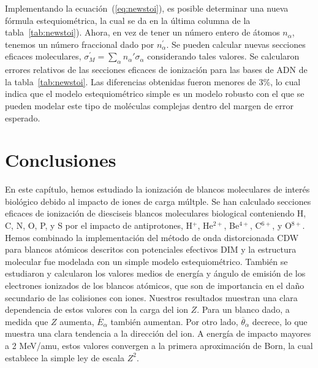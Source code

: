 Implementando la ecuación~(\ref{eq:newstoi}), es posible determinar
una nueva fórmula estequiométrica, la cual se da en la última columna de
la tabla~\ref{tab:newstoi}). Ahora, en vez de tener un número entero 
de átomos $n_{\alpha}$, tenemos un número fraccional dado por 
$n_{\alpha}^{\prime}$. Se pueden calcular nuevas secciones eficaces 
moleculares, $\sigma^{\prime}_{M}=\sum_{\alpha}n_{\alpha}'\sigma_{\alpha}$
considerando tales valores. Se calcularon errores relativos de las 
secciones eficaces de ionización para las bases de ADN de la 
tabla~\ref{tab:newstoi}. Las diferencias obtenidas fueron menores de
3\%, lo cual indica que el modelo estequiométrico simple 
es un modelo robusto con el que se pueden modelar este tipo de 
moléculas complejas dentro del margen de error esperado.

\section{Conclusiones}

En este capítulo, hemos estudiado la ionización de blancos moleculares 
de interés biológico debido al impacto de iones de carga múltple. Se han
calculado secciones eficaces de ionización de diesciseis blancos 
moleculares biological conteniendo H, C, N, O, P, y S por el impacto de
antiprotones, H$^{+}$, He$^{2+}$, Be$^{4+}$, C$^{6+}$, y O$^{8+}$. 
Hemos combinado la implementación del método de onda distorcionada
CDW para blancos atómicos descritos con potenciales efectivos DIM y la 
estructura molecular fue modelada con un simple modelo estequiométrico.
También se estudiaron y calcularon los valores medios de energía y 
ángulo de emisión de los electrones ionizados de los blancos atómicos, 
que son de importancia en el daño secundario de las colisiones con iones.
Nuestros resultados muestran una clara dependencia de estos valores con 
la carga del ion $Z$. Para un blanco dado, a medida que $Z$ aumenta,
$\overline{E}_{\alpha}$ también aumentan. Por otro lado, 
$\overline{\theta}_{\alpha}$ decrece, lo que muestra una clara tendencia 
a la dirección del ion. A energía de impacto mayores a 2 MeV/amu, estos
valores convergen a la primera aproximación de Born, la cual establece 
la simple ley de escala $Z^{2}$. 

